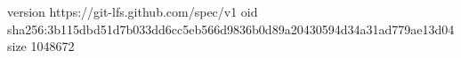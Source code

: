 version https://git-lfs.github.com/spec/v1
oid sha256:3b115dbd51d7b033dd6cc5eb566d9836b0d89a20430594d34a31ad779ae13d04
size 1048672

